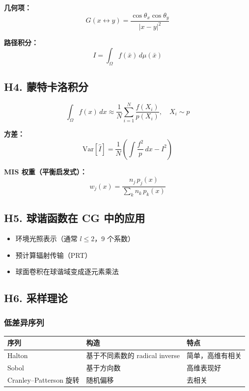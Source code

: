 \textbf{几何项：}
\[
G(x \leftrightarrow y) = \frac{\cos\theta_x \cos\theta_y}{|x - y|^2}
\]

\textbf{路径积分：}
\[
I = \int_{\Omega} f(\bar{x})\, d\mu(\bar{x})
\]

\subsection{H4. 蒙特卡洛积分}

\[
\int_\Omega f(x)\,dx \approx \frac{1}{N}\sum_{i=1}^N \frac{f(X_i)}{p(X_i)}, \quad X_i \sim p
\]

\textbf{方差：}
\[
\text{Var}[\hat{I}] = \frac{1}{N}\left(\int \frac{f^2}{p}\,dx - I^2\right)
\]

\textbf{MIS 权重（平衡启发式）：}
\[
w_j(x) = \frac{n_j\, p_j(x)}{\sum_k n_k\, p_k(x)}
\]

\subsection{H5. 球谐函数在 CG 中的应用}

\begin{itemize}
  \item 环境光照表示（通常 $l \leq 2$，9 个系数）
  \item 预计算辐射传输（PRT）
  \item 球面卷积在球谐域变成逐元素乘法
\end{itemize}

\subsection{H6. 采样理论}

\subsubsection{低差异序列}

\begin{center}
\begin{tabular}{lll}
\toprule
\textbf{序列} & \textbf{构造} & \textbf{特点} \\
\midrule
Halton & 基于不同素数的 radical inverse & 简单，高维有相关 \\
Sobol & 基于方向数 & 高维表现好 \\
Cranley--Patterson 旋转 & 随机偏移 & 去相关 \\
\bottomrule
\end{tabular}
\end{center}

